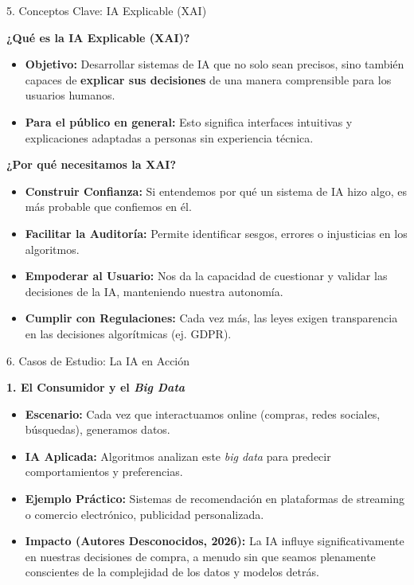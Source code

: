 \documentclass[aspectratio=169]{beamer}
\begin{document}
\begin{frame}[fragile]{5. Conceptos Clave: IA Explicable (XAI)}


\textbf{¿Qué es la IA Explicable (XAI)?}
\begin{itemize}
  \item \textbf{Objetivo:} Desarrollar sistemas de IA que no solo sean precisos, sino también capaces de \textbf{explicar sus decisiones} de una manera comprensible para los usuarios humanos.
  \item \textbf{Para el público en general:} Esto significa interfaces intuitivas y explicaciones adaptadas a personas sin experiencia técnica.
\end{itemize}
\textbf{¿Por qué necesitamos la XAI?}
\begin{itemize}
  \item \textbf{Construir Confianza:} Si entendemos por qué un sistema de IA hizo algo, es más probable que confiemos en él.
  \item \textbf{Facilitar la Auditoría:} Permite identificar sesgos, errores o injusticias en los algoritmos.
  \item \textbf{Empoderar al Usuario:} Nos da la capacidad de cuestionar y validar las decisiones de la IA, manteniendo nuestra autonomía.
  \item \textbf{Cumplir con Regulaciones:} Cada vez más, las leyes exigen transparencia en las decisiones algorítmicas (ej. GDPR).
\end{itemize}
\end{frame}



\begin{frame}[fragile]{6. Casos de Estudio: La IA en Acción}


\textbf{1. El Consumidor y el \textit{Big Data}}
\begin{itemize}
  \item \textbf{Escenario:} Cada vez que interactuamos online (compras, redes sociales, búsquedas), generamos datos.
  \item \textbf{IA Aplicada:} Algoritmos analizan este \textit{big data} para predecir comportamientos y preferencias.
  \item \textbf{Ejemplo Práctico:} Sistemas de recomendación en plataformas de streaming o comercio electrónico, publicidad personalizada.
  \item \textbf{Impacto (Autores Desconocidos, 2026):} La IA influye significativamente en nuestras decisiones de compra, a menudo sin que seamos plenamente conscientes de la complejidad de los datos y modelos detrás.
\end{itemize}
\end{frame}
\end{document}
